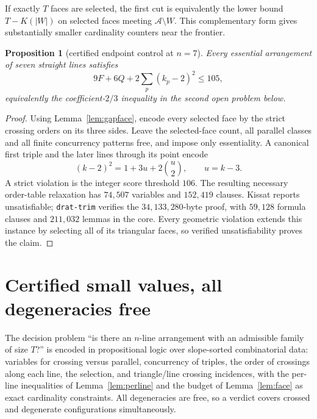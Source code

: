 \documentclass[11pt]{article}
\newtheorem{proposition}[theorem]{Proposition}
\theoremstyle{definition}
\begin{document}
If exactly $T$ faces are selected, the first cut is equivalently the lower
bound $T-K(|W|)$ on selected faces meeting
$\mathcal A\setminus W$. This complementary form gives substantially smaller
cardinality counters near the frontier.

\begin{proposition}[certified endpoint control at $n=7$]\label{prop:c23n7}
Every essential arrangement of seven straight lines satisfies
\[
 9F+6Q+2\sum_p(k_p-2)^2\le105,
\]
equivalently the coefficient-$2/3$ inequality in the second open problem
below.
\end{proposition}

\begin{proof}
Using Lemma~\ref{lem:gapface}, encode every selected face by the strict
crossing orders on its three sides. Leave the selected-face count,
all parallel classes and all finite concurrency patterns free, and impose
only essentiality. A canonical first triple and the later lines through its
point encode
\[
 (k-2)^2=1+3u+2\binom u2,\qquad u=k-3.
\]
A strict violation is the integer score threshold $106$. The resulting
necessary order-table relaxation has $74{,}507$ variables and $152{,}419$
clauses. Kissat reports unsatisfiable; \texttt{drat-trim} verifies the
$34{,}133{,}280$-byte proof, with $59{,}128$ formula clauses and $211{,}032$
lemmas in the core. Every geometric violation extends this instance by
selecting all of its triangular faces, so verified unsatisfiability proves
the claim.
\end{proof}


\section{Certified small values, all degeneracies free}\label{sec:ladder}

The decision problem ``is there an $n$-line arrangement with an admissible
family of size $T$?'' is encoded in propositional logic over slope-sorted
combinatorial data: variables for crossing versus parallel, concurrency of
triples, the order of crossings along each line, the selection, and
triangle/line crossing incidences, with the per-line inequalities of
Lemma~\ref{lem:perline} and the budget of Lemma~\ref{lem:face} as exact
cardinality constraints. All degeneracies are free, so a verdict covers
crossed and degenerate configurations simultaneously.
\end{document}
